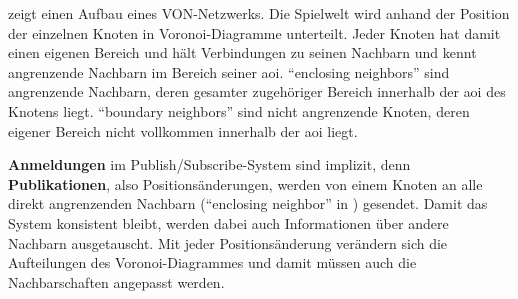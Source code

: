 zeigt einen Aufbau eines VON-Netzwerks. Die Spielwelt wird anhand der Position der einzelnen Knoten in Voronoi-Diagramme unterteilt. Jeder Knoten hat damit einen eigenen Bereich und hält Verbindungen zu seinen Nachbarn und kennt angrenzende Nachbarn im Bereich seiner \ac{aoi}. \enquote{enclosing neighbors'' sind angrenzende Nachbarn, deren gesamter zugehöriger Bereich innerhalb der \ac{aoi} des Knotens liegt. ``boundary neighbors} sind nicht angrenzende Knoten, deren eigener Bereich nicht vollkommen innerhalb der \ac{aoi} liegt.

\textbf{Anmeldungen} im Publish/Subscribe-System sind implizit, denn \textbf{Publikationen}, also Positionsänderungen, werden von einem Knoten an alle direkt angrenzenden Nachbarn (\enquote{enclosing neighbor} in ) gesendet. Damit das System konsistent bleibt, werden dabei auch Informationen über andere Nachbarn ausgetauscht. Mit jeder Positionsänderung verändern sich die Aufteilungen des Voronoi-Diagrammes und damit müssen auch die Nachbarschaften angepasst werden.
